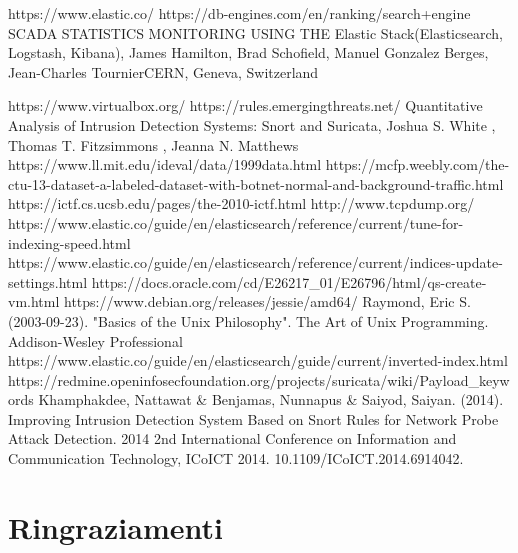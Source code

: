 \documentclass[12pt,a4paper,openright,twoside]{report}
\begin{document}
\begin{thebibliography}{90}
 https://www.elastic.co/
 https://db-engines.com/en/ranking/search+engine
 SCADA STATISTICS MONITORING USING THE Elastic Stack(Elasticsearch, Logstash, Kibana), James Hamilton, Brad Schofield, Manuel Gonzalez Berges, Jean-Charles TournierCERN, Geneva, Switzerland

 https://www.virtualbox.org/
 https://rules.emergingthreats.net/
 Quantitative Analysis of Intrusion Detection Systems: Snort and Suricata, Joshua S. White , Thomas T. Fitzsimmons , Jeanna N. Matthews
 https://www.ll.mit.edu/ideval/data/1999data.html
 https://mcfp.weebly.com/the-ctu-13-dataset-a-labeled-dataset-with-botnet-normal-and-background-traffic.html
 https://ictf.cs.ucsb.edu/pages/the-2010-ictf.html
 http://www.tcpdump.org/
 https://www.elastic.co/guide/en/elasticsearch/reference/current/tune-for-indexing-speed.html
 https://www.elastic.co/guide/en/elasticsearch/reference/current/indices-update-settings.html
 https://docs.oracle.com/cd/E26217\_01/E26796/html/qs-create-vm.html
 https://www.debian.org/releases/jessie/amd64/
 Raymond, Eric S. (2003-09-23). "Basics of the Unix Philosophy". The Art of Unix Programming. Addison-Wesley Professional
 https://www.elastic.co/guide/en/elasticsearch/guide/current/inverted-index.html
 https://redmine.openinfosecfoundation.org/projects/suricata/wiki/Payload\_keywords
 Khamphakdee, Nattawat & Benjamas, Nunnapus & Saiyod, Saiyan. (2014). Improving Intrusion Detection System Based on Snort Rules for Network Probe Attack Detection. 2014 2nd International Conference on Information and Communication Technology, ICoICT 2014. 10.1109/ICoICT.2014.6914042.
\end{thebibliography}
\clearpage{\pagestyle{empty}\cleardoublepage}
\chapter*{Ringraziamenti}
\thispagestyle{empty}
\end{document}
